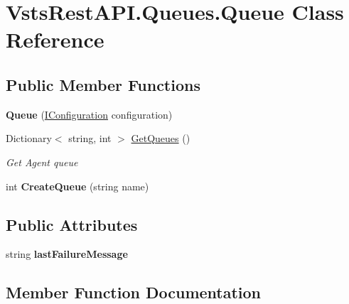 \hypertarget{class_vsts_rest_a_p_i_1_1_queues_1_1_queue}{}\section{Vsts\+Rest\+A\+P\+I.\+Queues.\+Queue Class Reference}
\label{class_vsts_rest_a_p_i_1_1_queues_1_1_queue}
\subsection*{Public Member Functions}
\begin{DoxyCompactItemize}
\item 
\mbox{\label{class_vsts_rest_a_p_i_1_1_queues_1_1_queue_af4f41af0b2fcff3a7fce8e852d020fb8}} 
{\bfseries Queue} (\mbox{\hyperlink{interface_vsts_rest_a_p_i_1_1_i_configuration}{I\+Configuration}} configuration)
\item 
Dictionary$<$ string, int $>$ \mbox{\hyperlink{class_vsts_rest_a_p_i_1_1_queues_1_1_queue_a25b076002dd514e7a069197b24e9de56}{Get\+Queues}} ()
\begin{DoxyCompactList}\small\item\em Get Agent queue \end{DoxyCompactList}\item 
\mbox{\label{class_vsts_rest_a_p_i_1_1_queues_1_1_queue_a70ffbed55a315ec9077a6efd3ae1f1b0}} 
int {\bfseries Create\+Queue} (string name)
\end{DoxyCompactItemize}
\subsection*{Public Attributes}
\begin{DoxyCompactItemize}
\item 
\mbox{\label{class_vsts_rest_a_p_i_1_1_queues_1_1_queue_a5ec3420e27cf685d0d2fea8b4246fe3a}} 
string {\bfseries last\+Failure\+Message}
\end{DoxyCompactItemize}


\subsection{Member Function Documentation}
\mbox{\label{class_vsts_rest_a_p_i_1_1_queues_1_1_queue_a25b076002dd514e7a069197b24e9de56}} 
